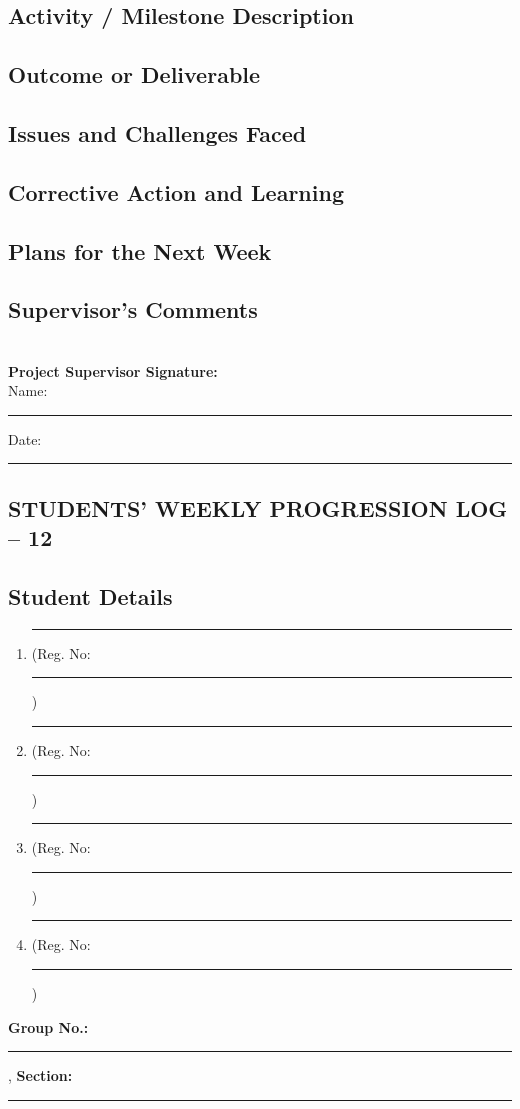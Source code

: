 \documentclass[a4paper]{article}
\begin{document}
				 
\subsection*{Activity / Milestone Description}
\framebox[\textwidth][c]{\rule{0pt}{4cm}}

\subsection*{Outcome or Deliverable}
\framebox[\textwidth][c]{\rule{0pt}{4cm}}


\subsection*{Issues and Challenges Faced}
\framebox[\textwidth][c]{\rule{0pt}{4cm}}


\subsection*{Corrective Action and Learning}
\framebox[\textwidth][c]{\rule{0pt}{4cm}}


\subsection*{Plans for the Next Week}
\framebox[\textwidth][c]{\rule{0pt}{4cm}}

\subsection*{Supervisor's Comments}
\framebox[\textwidth][c]{\rule{0pt}{4cm}}\\[2em]

\vfill
\textbf{Project Supervisor Signature:}\\[1em]
Name: \rule{6cm}{0.4pt} \hfill Date: \rule{4cm}{0.4pt}


\newpage
\begin{center}
\section*{STUDENTS' WEEKLY PROGRESSION LOG -- 12}
\end{center}
\subsection*{Student Details}
\begin{enumerate}[itemsep=0em]
\item \rule{8cm}{0.4pt} (Reg. No:\rule{2cm}{0.4pt})
\item \rule{8cm}{0.4pt} (Reg. No:\rule{2cm}{0.4pt})
\item \rule{8cm}{0.4pt} (Reg. No:\rule{2cm}{0.4pt})
\item \rule{8cm}{0.4pt} (Reg. No:\rule{2cm}{0.4pt})
\end{enumerate}
\textbf{Group No.:} \rule{4cm}{0.4pt}, \textbf{Section:} \rule{3.5cm}{0.4pt}
\end{document}
